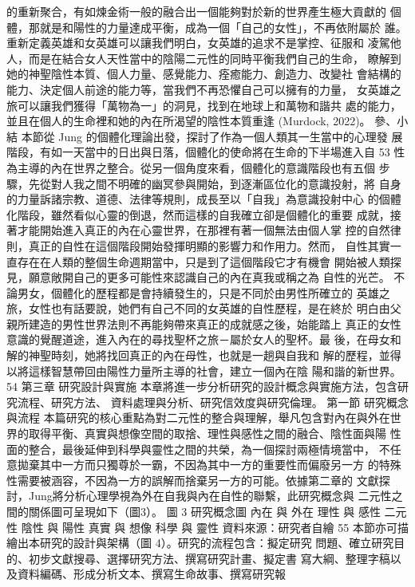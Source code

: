 的重新聚合，有如煉金術一般的融合出一個能夠對於新的世界產生極大貢獻的
個體，那就是和陽性的力量達成平衡，成為一個「自己的女性」，不再依附屬於
誰。 
重新定義英雄和女英雄可以讓我們明白，女英雄的追求不是掌控、征服和
凌駕他人，而是在結合女人天性當中的陰陽二元性的同時平衡我們自己的生命，
瞭解到她的神聖陰性本質、個人力量、感覺能力、痊癒能力、創造力、改變社
會結構的能力、決定個人前途的能力等，當我們不再恐懼自己可以擁有的力量，
女英雄之旅可以讓我們獲得「萬物為一」的洞見，找到在地球上和萬物和諧共
處的能力，並且在個人的生命裡和她的內在所渴望的陰性本質重逢 (Murdock, 
2022)。 
參、小結 
本節從 Jung 的個體化理論出發，探討了作為一個人類其一生當中的心理發
展階段，有如一天當中的日出與日落，個體化的使命將在生命的下半場進入自
53 
性為主導的內在世界之整合。從另一個角度來看，個體化的意識階段也有五個
步驟，先從對人我之間不明確的幽冥參與開始，到逐漸區位化的意識投射，將
自身的力量訴諸宗教、道德、法律等規則，成長至以「自我」為意識投射中心
的個體化階段，雖然看似心靈的倒退，然而這樣的自我確立卻是個體化的重要
成就，接著才能開始進入真正的內在心靈世界，在那裡有著一個無法由個人掌
控的自然律則，真正的自性在這個階段開始發揮明顯的影響力和作用力。然而，
自性其實一直存在在人類的整個生命週期當中，只是到了這個階段它才有機會
開始被人類探見，願意敞開自己的更多可能性來認識自己的內在真我或稱之為
自性的光芒。 
不論男女，個體化的歷程都是會持續發生的，只是不同於由男性所確立的
英雄之旅，女性也有話要說，她們有自己不同的女英雄的自性歷程，是在終於
明白由父親所建造的男性世界法則不再能夠帶來真正的成就感之後，始能踏上
真正的女性意識的覺醒道途，進入內在的尋找聖杯之旅－屬於女人的聖杯。最
後，在母女和解的神聖時刻，她將找回真正的內在母性，也就是一趟與自我和
解的歷程，並得以將這樣智慧帶回由陽性力量所主導的社會，建立一個內在陰
陽和諧的新世界。 
54 
第三章 研究設計與實施 
本章將進一步分析研究的設計概念與實施方法，包含研究流程、研究方法、
資料處理與分析、研究信效度與研究倫理。 
第一節 研究概念與流程 
本篇研究的核心重點為對二元性的整合與理解，舉凡包含對內在與外在世
界的取得平衡、真實與想像空間的取捨、理性與感性之間的融合、陰性面與陽
性面的整合，最後延伸到科學與靈性之間的共榮，為一個探討兩極情境當中，
不任意拋棄其中一方而只獨尊於一霸，不因為其中一方的重要性而偏廢另一方
的特殊性需要被涵容，不因為一方的誤解而捨棄另一方的可能。依據第二章的
文獻探討，Jung將分析心理學視為外在自我與內在自性的聯繫，此研究概念與
二元性之間的關係圖可呈現如下（圖3）。 
圖 3  
研究概念圖 
內在
與
外在
理性
與
感性
二元性
陰性
與
陽性
真實
與
想像
科學
與
靈性
資料來源：研究者自繪 
55 
本節亦可描繪出本研究的設計與架構（圖 4）。研究的流程包含：擬定研究
問題、確立研究目的、初步文獻搜尋、選擇研究方法、撰寫研究計畫、擬定書
寫大綱、整理字稿以及資料編碼、形成分析文本、撰寫生命故事、撰寫研究報

